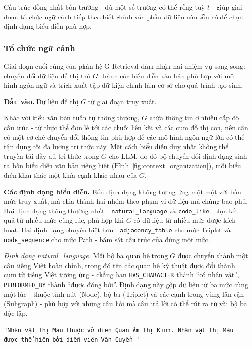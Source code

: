 Cấu trúc đồng nhất bốn trường - dù một số trường có thể rỗng tuỳ $t$ - giúp giai đoạn tổ chức ngữ cảnh tiếp theo biết chính xác phần dữ liệu nào sẵn có để chọn định dạng biểu diễn phù hợp.

\subsubsection{Tổ chức ngữ cảnh}

Giai đoạn cuối cùng của phân hệ G-Retrieval đảm nhận hai nhiệm vụ song song: chuyển đổi dữ liệu đồ thị thô $G$ thành các biểu diễn văn bản phù hợp với mô hình ngôn ngữ và trích xuất tập dữ kiện chính làm cơ sở cho quá trình tạo sinh.

\textbf{Đầu vào.} Dữ liệu đồ thị $G$ từ giai đoạn truy xuất.

Khác với kiểu văn bản tuần tự thông thường, $G$ chứa thông tin ở nhiều cấp độ cấu trúc - từ thực thể đơn lẻ tới các chuỗi liên kết và các cụm đồ thị con, nên cần có một cơ chế chuyển đổi thông tin phù hợp để các mô hình ngôn ngữ lớn có thể tận dụng tối đa lượng tri thức này. Một cách biểu diễn duy nhất không thể truyền tải đầy đủ tri thức trong $G$ cho LLM, do đó bộ chuyển đổi định dạng sinh ra bốn biểu diễn văn bản riêng biệt (Hình~\ref{fig:context_organization}), mỗi biểu diễn khai thác một khía cạnh khác nhau của $G$.

\textbf{Các định dạng biểu diễn.} Bốn định dạng không tương ứng một-một với bốn mức truy xuất, mà chia thành hai nhóm theo phạm vi dữ liệu mà chúng bao phủ. Hai định dạng thông thường nhất - \texttt{natural\_language} và \texttt{code\_like} - đọc kết quả từ nhiều mức cùng lúc, phù hợp khi $G$ có dữ liệu từ nhiều mức được kích hoạt. Hai định dạng chuyên biệt hơn - \texttt{adjacency\_table} cho mức Triplet và \texttt{node\_sequence} cho mức Path - bám sát cấu trúc của đúng một mức.

\textit{Định dạng natural\_language.} Mỗi bộ ba quan hệ trong $G$ được chuyển thành một câu tiếng Việt hoàn chỉnh, trong đó tên các quan hệ kỹ thuật được đổi thành cụm từ tiếng Việt tương ứng - chẳng hạn \texttt{HAS\_CHARACTER} thành ``có nhân vật'', \texttt{PERFORMED\_BY} thành ``được đóng bởi''. Định dạng này gộp dữ liệu từ ba mức cùng một lúc - thuộc tính nút (Node), bộ ba (Triplet) và các cạnh trong vùng lân cận (Subgraph) - phù hợp với những câu hỏi mà câu trả lời có thể rút ra từ vài bộ ba độc lập.

\vspace{0.5em}
\begin{tcolorbox}[colback=gray!5, colframe=black!50, arc=4pt, boxrule=0.5pt, left=4pt, right=4pt, top=4pt, bottom=4pt, boxsep=0pt]
\small \texttt{"Nhân vật Thị Màu thuộc vở diễn Quan Âm Thị Kính. Nhân vật Thị Màu được thể hiện bởi diễn viên Vân Quyền."}
\end{tcolorbox}

